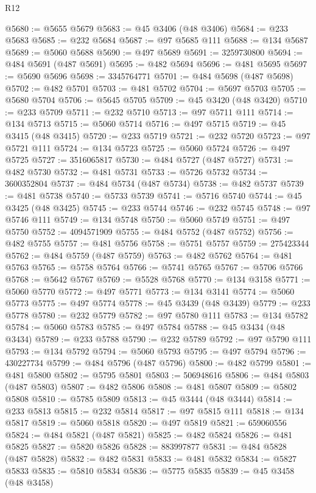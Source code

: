 \begin{lexlean}{R12}
\begin{coremodule}
@5680 := @5655 @5679
@5683 := @45 @3406 (@48 @3406)
@5684 := @233 @5683
@5685 := @232 @5684
@5687 := @97 @5685 @111
@5688 := @134 @5687
@5689 := @5060 @5688
@5690 := @497 @5689
@5691 := 3259730800
@5694 := @484 @5691 (@487 @5691)
@5695 := @482 @5694
@5696 := @481 @5695
@5697 := @5690 @5696
@5698 := 3345764771
@5701 := @484 @5698 (@487 @5698)
@5702 := @482 @5701
@5703 := @481 @5702
@5704 := @5697 @5703
@5705 := @5680 @5704
@5706 := @5645 @5705
@5709 := @45 @3420 (@48 @3420)
@5710 := @233 @5709
@5711 := @232 @5710
@5713 := @97 @5711 @111
@5714 := @134 @5713
@5715 := @5060 @5714
@5716 := @497 @5715
@5719 := @45 @3415 (@48 @3415)
@5720 := @233 @5719
@5721 := @232 @5720
@5723 := @97 @5721 @111
@5724 := @134 @5723
@5725 := @5060 @5724
@5726 := @497 @5725
@5727 := 3516065817
@5730 := @484 @5727 (@487 @5727)
@5731 := @482 @5730
@5732 := @481 @5731
@5733 := @5726 @5732
@5734 := 3600352804
@5737 := @484 @5734 (@487 @5734)
@5738 := @482 @5737
@5739 := @481 @5738
@5740 := @5733 @5739
@5741 := @5716 @5740
@5744 := @45 @3425 (@48 @3425)
@5745 := @233 @5744
@5746 := @232 @5745
@5748 := @97 @5746 @111
@5749 := @134 @5748
@5750 := @5060 @5749
@5751 := @497 @5750
@5752 := 4094571909
@5755 := @484 @5752 (@487 @5752)
@5756 := @482 @5755
@5757 := @481 @5756
@5758 := @5751 @5757
@5759 := 275423344
@5762 := @484 @5759 (@487 @5759)
@5763 := @482 @5762
@5764 := @481 @5763
@5765 := @5758 @5764
@5766 := @5741 @5765
@5767 := @5706 @5766
@5768 := @5642 @5767
@5769 := @5528 @5768
@5770 := @134 @3158
@5771 := @5060 @5770
@5772 := @497 @5771
@5773 := @134 @3141
@5774 := @5060 @5773
@5775 := @497 @5774
@5778 := @45 @3439 (@48 @3439)
@5779 := @233 @5778
@5780 := @232 @5779
@5782 := @97 @5780 @111
@5783 := @134 @5782
@5784 := @5060 @5783
@5785 := @497 @5784
@5788 := @45 @3434 (@48 @3434)
@5789 := @233 @5788
@5790 := @232 @5789
@5792 := @97 @5790 @111
@5793 := @134 @5792
@5794 := @5060 @5793
@5795 := @497 @5794
@5796 := 430227734
@5799 := @484 @5796 (@487 @5796)
@5800 := @482 @5799
@5801 := @481 @5800
@5802 := @5795 @5801
@5803 := 506948616
@5806 := @484 @5803 (@487 @5803)
@5807 := @482 @5806
@5808 := @481 @5807
@5809 := @5802 @5808
@5810 := @5785 @5809
@5813 := @45 @3444 (@48 @3444)
@5814 := @233 @5813
@5815 := @232 @5814
@5817 := @97 @5815 @111
@5818 := @134 @5817
@5819 := @5060 @5818
@5820 := @497 @5819
@5821 := 659060556
@5824 := @484 @5821 (@487 @5821)
@5825 := @482 @5824
@5826 := @481 @5825
@5827 := @5820 @5826
@5828 := 883997877
@5831 := @484 @5828 (@487 @5828)
@5832 := @482 @5831
@5833 := @481 @5832
@5834 := @5827 @5833
@5835 := @5810 @5834
@5836 := @5775 @5835
@5839 := @45 @3458 (@48 @3458)

\end{coremodule}
\end{lexlean}

